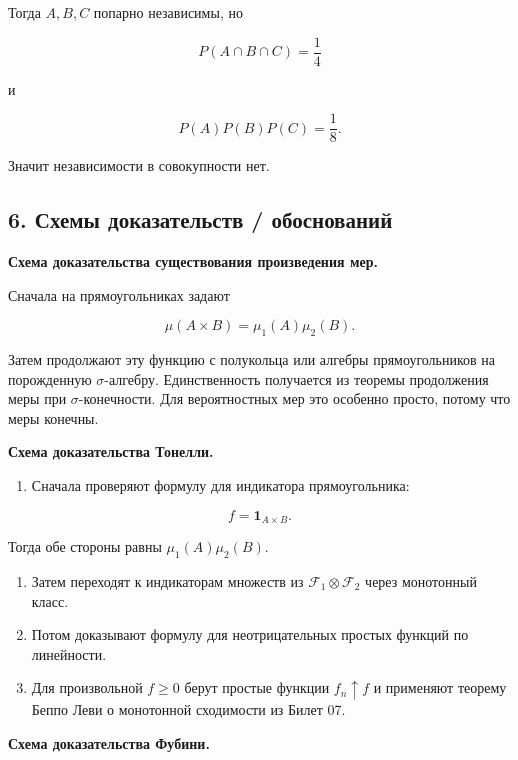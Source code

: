 \documentclass[
  11pt,
  a4paper,
]{article}
\providecommand{\tightlist}{%
  \setlength{\itemsep}{0pt}\setlength{\parskip}{0pt}}
\begin{document}
Тогда \(A,B,C\) попарно независимы, но

\[
P(A\cap B\cap C)=\frac14
\]

и

\[
P(A)P(B)P(C)=\frac18.
\]

Значит независимости в совокупности нет.

\subsection{6. Схемы доказательств /
обоснований}\label{ux441ux445ux435ux43cux44b-ux434ux43eux43aux430ux437ux430ux442ux435ux43bux44cux441ux442ux432-ux43eux431ux43eux441ux43dux43eux432ux430ux43dux438ux439}

\textbf{Схема доказательства существования произведения мер.}

Сначала на прямоугольниках задают

\[
\mu(A\times B)=\mu_1(A)\mu_2(B).
\]

Затем продолжают эту функцию с полукольца или алгебры прямоугольников на
порожденную \(\sigma\)-алгебру. Единственность получается из теоремы
продолжения меры при \(\sigma\)-конечности. Для вероятностных мер это
особенно просто, потому что меры конечны.

\textbf{Схема доказательства Тонелли.}

\begin{enumerate}
\def\labelenumi{\arabic{enumi}.}
\tightlist
\item
  Сначала проверяют формулу для индикатора прямоугольника:
\end{enumerate}

\[
f=\mathbf 1_{A\times B}.
\]

Тогда обе стороны равны \(\mu_1(A)\mu_2(B)\).

\begin{enumerate}
\def\labelenumi{\arabic{enumi}.}
\setcounter{enumi}{1}
\item
  Затем переходят к индикаторам множеств из
  \(\mathcal F_1\otimes\mathcal F_2\) через монотонный класс.
\item
  Потом доказывают формулу для неотрицательных простых функций по
  линейности.
\item
  Для произвольной \(f\ge0\) берут простые функции \(f_n\uparrow f\) и
  применяют теорему Беппо Леви о монотонной сходимости из Билет 07.
\end{enumerate}

\textbf{Схема доказательства Фубини.}
\end{document}
